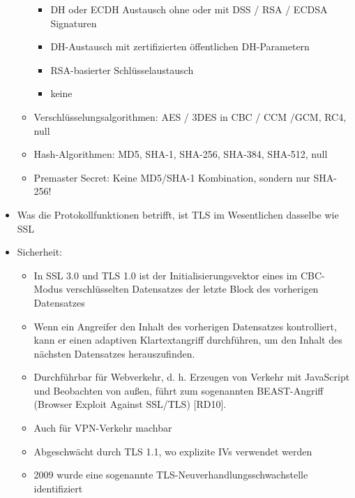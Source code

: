 \documentclass[a4paper]{article}
\begin{document}
\begin{multicols}{3}
\begin{itemize}
\begin{itemize}
                        \begin{itemize}
                            \item
                                  DH oder ECDH Austausch ohne oder mit DSS / RSA / ECDSA Signaturen
                            \item
                                  DH-Austausch mit zertifizierten öffentlichen DH-Parametern
                            \item
                                  RSA-basierter Schlüsselaustausch
                            \item
                                  keine
                        \end{itemize}
                  \item
                        Verschlüsselungsalgorithmen: AES / 3DES in CBC / CCM /GCM, RC4, null
                  \item
                        Hash-Algorithmen: MD5, SHA-1, SHA-256, SHA-384, SHA-512, null
                  \item
                        Premaster Secret: Keine MD5/SHA-1 Kombination, sondern nur SHA-256!
              \end{itemize}
        \item
              Was die Protokollfunktionen betrifft, ist TLS im Wesentlichen dasselbe
              wie SSL
        \item
              Sicherheit:

              \begin{itemize}
                  \item
                        In SSL 3.0 und TLS 1.0 ist der Initialisierungsvektor eines im
                        CBC-Modus verschlüsselten Datensatzes der letzte Block des
                        vorherigen Datensatzes
                  \item
                        Wenn ein Angreifer den Inhalt des vorherigen Datensatzes
                        kontrolliert, kann er einen adaptiven Klartextangriff durchführen,
                        um den Inhalt des nächsten Datensatzes herauszufinden.
                  \item
                        Durchführbar für Webverkehr, d. h. Erzeugen von Verkehr mit
                        JavaScript und Beobachten von außen, führt zum sogenannten
                        BEAST-Angriff (Browser Exploit Against SSL/TLS) {[}RD10{]}.
                  \item
                        Auch für VPN-Verkehr machbar
                  \item
                        Abgeschwächt durch TLS 1.1, wo explizite IVs verwendet werden
                  \item
                        2009 wurde eine sogenannte TLS-Neuverhandlungsschwachstelle
                        identifiziert


\end{itemize}
\end{itemize}
\end{multicols}
\end{document}
